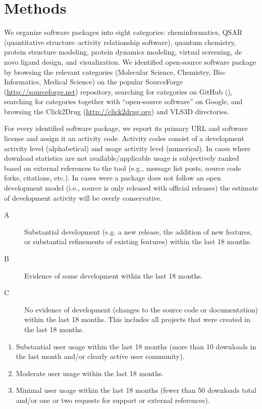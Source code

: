 \section{Methods}

We organize software packages into eight categories: cheminformatics, QSAR (quantitative structure–activity relationship software), quantum chemistry, protein structure modeling, protein dynamics modeling, virtual screening, de novo ligand design, and visualization.
We identified open-source software package by browsing the relevant categories (Molecular Science, Chemistry, Bio-Informatics, Medical Science) on the popular SourceForge (\url{http://sourceforge.net}) repository, searching for categories on GitHub (\href{http://github.com}), searching for categories together with ``open-source software'' on Google, and browsing the Click2Drug (\url{http://click2drug.org}) and VLS3D \cite{Villoutreix_2013} directories.

For every identified software package, we report its primary URL and software license and assign it an activity code. Activity codes consist of a development activity level (alphabetical) and usage activity level (numerical). In cases where download statistics are not available/applicable usage is subjectively ranked based on external references to the tool (e.g., message list posts, source code forks, citations, etc.).  In cases were a package does not follow an open development model (i.e., source is only released with official releases) the estimate of development activity will be overly conservative.

\begin{description}
  \item[A] Substantial development (e.g. a new release, the addition of new features, or substantial refinements of existing features) within the last 18 months.
  \item[B] Evidence of some development within the last 18 months.
  \item[C] No evidence of development (changes to the source code or documentation) within the last 18 months. This includes all projects that were created in the last 18 months.
\end{description}
\begin{enumerate}
  \item Substantial user usage within the last 18 months (more than 10 downloads in the last month and/or clearly active user community).
  \item Moderate user usage within the last 18 months.
    \item Minimal user usage within the last 18 months (fewer than 50 downloads total and/or one or two requests for support or external references).
\end{enumerate}

